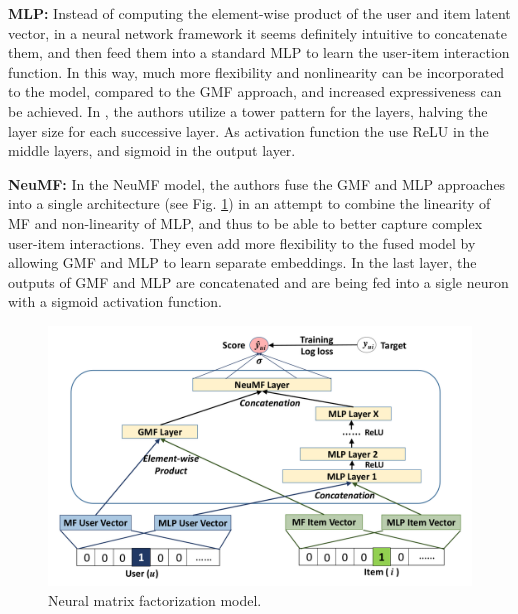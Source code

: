 \textbf{MLP:}
Instead of computing the element-wise product of the user and item latent vector, in a neural network framework it seems definitely intuitive to concatenate them, and then feed them into a standard MLP to learn the user-item interaction function.
In this way, much more flexibility and nonlinearity can be incorporated to the model, compared to the GMF approach, and increased expressiveness can be achieved. 
In \cite{he2017neural}, the authors utilize a tower pattern for the layers, halving the layer size for each successive layer.
As activation function the use ReLU in the middle layers, and sigmoid in the output layer.

\textbf{NeuMF:}
In the NeuMF model, the authors fuse the GMF and MLP approaches into a single architecture (see Fig. \ref{fig:neumf}) in an attempt to combine the linearity of MF and non-linearity of MLP, and thus to be able to better capture complex user-item interactions.
They even add more flexibility to the fused model by allowing GMF and MLP to learn separate embeddings.
In the last layer, the outputs of GMF and MLP are concatenated and are being fed into a sigle neuron with a sigmoid activation function.


\begin{figure}[t]
    \centering
    \includegraphics[width=0.8\linewidth]{images/neumf.png}
    \caption{Neural matrix factorization model.}
    \label{fig:neumf}
\end{figure}

